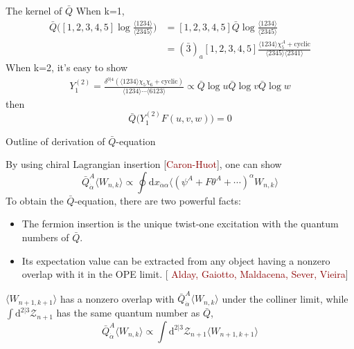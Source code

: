 \documentclass[10pt]{beamer}
\newcommand{\dif}{\mathrm{d}}
\begin{document}
\begin{frame}{The kernel of $\bar{Q}$}
  When k=1,
  \begin{align*}
    \bar{Q} \biggl([1,2,3,4,5]\log\frac{\langle1234\rangle}{\langle2345\rangle}\biggr) &= [1,2,3,4,5]\bar{Q} \log\frac{\langle1234\rangle}{\langle2345\rangle} \\
      &= (\bar{3})_{a} [1,2,3,4,5]\frac{\langle 1234\rangle\chi^{A}_{5}+\text{cyclic}}{\langle2345\rangle\langle 2341\rangle}
    \end{align*}
    When k=2, it's easy to show 
    \begin{align*}
      Y_{1}^{(2)}=\frac{\delta^{0\vert 4}(\langle 1234\rangle\chi_{5}\chi_{6}+\text{cyclic})}{\langle 1234\rangle\cdots \langle 6123\rangle} \propto \bar{Q}\log u\bar{Q}\log v\bar{Q}\log w
    \end{align*}
    then 
    \begin{equation*}
    \bar{Q}\bigl(Y_{1}^{(2)}F(u,v,w)\bigr)=0
    \end{equation*}
\end{frame}


\begin{frame}{Outline of derivation of $\bar{Q}$-equation} 

By using chiral Lagrangian insertion {\footnotesize[\textcolor{darkred}{Caron-Huot}]}, one can show  
\begin{equation*}
  \bar{Q}_{\dot{\alpha}}^{A}\langle W_{n,k}\rangle \propto \oint \dif x_{\dot{\alpha}\alpha} 
  \langle (\psi^{A}+F\theta^{A}+\cdots)^{\alpha} W_{n,k}\rangle
\end{equation*}
To obtain the $\bar{Q}$-equation, there are two powerful facts:
\begin{itemize}
  \item The fermion insertion is the unique twist-one excitation with the quantum numbers of $\bar{Q}$.
  \item Its expectation value can be extracted from any object having a nonzero overlap with it in the OPE limit. {\footnotesize[\textcolor{darkred}{ Alday, Gaiotto, Maldacena, Sever, Vieira}]}
\end{itemize}
$\langle W_{n+1,k+1}\rangle$ has a nonzero overlap with $\bar{Q}_{\dot{\alpha}}^{A}\langle W_{n,k}\rangle$ under the colliner limit, while $\int \dif^{2\vert 3} \mathcal{Z}_{n+1}$ has the same quantum number as $\bar{Q}$, 
\begin{equation*}
  \bar{Q}_{\dot{\alpha}}^{A}\langle W_{n,k}\rangle \propto \int \dif^{2\vert 3} \mathcal{Z}_{n+1} \langle W_{n+1,k+1}\rangle 
\end{equation*}

\end{frame} 
\end{document}
